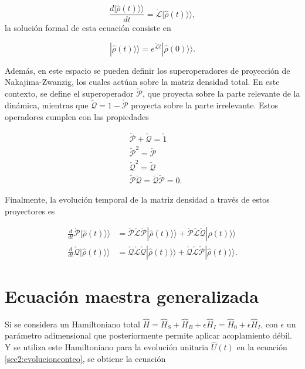 \begin{equation*}
    \frac{d|\hat{\rho}(t) \rangle \rangle}{dt} = \check{\mathcal{L}}|\hat{\rho}(t) \rangle \rangle,
\end{equation*}
la solución formal de esta ecuación consiste en

\begin{equation}
    |\hat{\rho}(t)\rangle \rangle = e^{\check{\mathcal{L}}t}|\hat{\rho}(0)\rangle \rangle. 
    \label{sec2liouvilleformal}
\end{equation}

Además, en este espacio se pueden definir los superoperadores de proyección de Nakajima-Zwanzig, los cuales actúan sobre la matriz densidad total. En este contexto, se define el superoperador \( \check{\mathcal{P}} \), que proyecta sobre la parte relevante de la dinámica, mientras que \( \check{\mathcal{Q}} = 1 - \check{\mathcal{P}} \) proyecta sobre la parte irrelevante\cite{zwanzig1966statistical}. Estos operadores cumplen con las propiedades

\begin{align*}
    & \check{\mathcal{P}} + \check{\mathcal{Q}} = \check{1} \\
    & \check{\mathcal{P}}^{2} = \check{\mathcal{P}} \\
    & \check{\mathcal{Q}}^{2} = \check{\mathcal{Q}} \\
    & \check{\mathcal{P}}\check{\mathcal{Q}} = \check{\mathcal{Q}}\check{\mathcal{P}} = 0.
\end{align*}    

Finalmente, la evolución temporal de la matriz densidad a través de estos proyectores es 

\begin{align*}
    \frac{d}{dt}\check{\mathcal{P}}|\hat{\rho}(t)\rangle \rangle & = \check{\mathcal{P}}\check{\mathcal{L}}\check{\mathcal{P}}|\hat{\rho}(t)\rangle \rangle  + \check{\mathcal{P}}\check{\mathcal{L}}\check{\mathcal{Q}}|\hat{\rho}(t)\rangle \rangle \\
    \frac{d}{dt}\check{\mathcal{Q}}|\hat{\rho}(t)\rangle \rangle  & = \check{\mathcal{Q}}\check{\mathcal{L}}\check{\mathcal{Q}}|\hat{\rho}(t)\rangle \rangle  + \check{\mathcal{Q}}\check{\mathcal{L}}\check{\mathcal{P}}|\hat{\rho}(t)\rangle \rangle.
\end{align*}

\label{sec2:superop}

\newpage

\section{Ecuación maestra generalizada}
Si se considera un Hamiltoniano total $\hat{H} = \hat{H}_{S} + \hat{H}_{B} + \epsilon \hat{H}_{I} = \hat{H}_{0} + \epsilon \hat{H}_{I}$, con $\epsilon$ un parámetro adimensional que posteriormente permite aplicar acoplamiento débil. Y se utiliza este Hamiltoniano para la evolución unitaria $\hat{U}(t)$ en la ecuación \ref{sec2:evolucionconteo}, se obtiene la ecuación 

